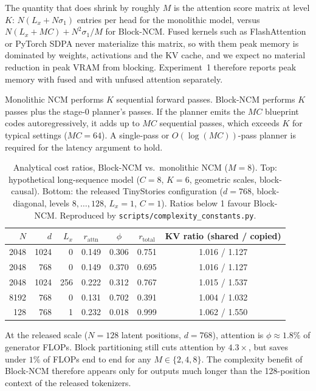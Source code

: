 \begin{remark}
The quantity that does shrink by roughly $M$ is the attention score matrix at
level $K$: $N(L_x+N\sigma_1)$ entries per head for the monolithic model, versus
$N(L_x+MC)+N^2\sigma_1/M$ for Block-NCM. Fused kernels such as
FlashAttention or PyTorch SDPA never materialize this matrix, so with them
peak memory is dominated by weights, activations and the KV cache, and we
expect no material reduction in peak VRAM from blocking.
Experiment~1 therefore reports peak memory with fused and with unfused
attention separately.
\end{remark}

\begin{remark}
Monolithic NCM performs $K$ sequential forward passes. Block-NCM performs $K$
passes plus the stage-0 planner's passes. If the planner emits the $MC$
blueprint codes autoregressively, it adds up to $MC$ sequential passes, which
exceeds $K$ for typical settings ($MC=64$). A single-pass or $O(\log(MC))$-pass
planner is required for the latency argument to hold.
\end{remark}

\begin{table}[t]
\centering
\caption{Analytical cost ratios, Block-NCM vs.\ monolithic NCM ($M=8$).
Top: hypothetical long-sequence model ($C=8$, $K=6$, geometric scales,
block-causal). Bottom: the released TinyStories configuration ($d=768$,
block-diagonal, levels $8,\dots,128$, $L_x=1$, $C=1$). Ratios below 1 favour
Block-NCM. Reproduced by \texttt{scripts/complexity\_constants.py}.}
\label{tab:constants}
\small
\begin{tabular}{@{}rrrcccc@{}}
\toprule
$N$ & $d$ & $L_x$ & $r_{\mathrm{attn}}$ & $\phi$ & $r_{\mathrm{total}}$ & KV ratio (shared / copied)\\
\midrule
2048 & 1024 & 0   & 0.149 & 0.306 & 0.751 & 1.016 / 1.127\\
2048 &  768 & 0   & 0.149 & 0.370 & 0.695 & 1.016 / 1.127\\
2048 & 1024 & 256 & 0.222 & 0.312 & 0.767 & 1.015 / 1.537\\
8192 &  768 & 0   & 0.131 & 0.702 & 0.391 & 1.004 / 1.032\\
\midrule
 128 &  768 & 1   & 0.232 & 0.018 & 0.999 & 1.062 / 1.550\\
\bottomrule
\end{tabular}
\end{table}

\begin{remark}
At the released scale ($N=128$ latent positions, $d=768$), attention is
$\phi\approx1.8\%$ of generator FLOPs. Block partitioning still cuts attention
by $4.3\times$, but saves under $1\%$ of FLOPs end to end for any
$M\in\{2,4,8\}$. The complexity benefit of
Block-NCM therefore appears only for outputs much longer than the
128-position context of the released tokenizers.
\end{remark}

